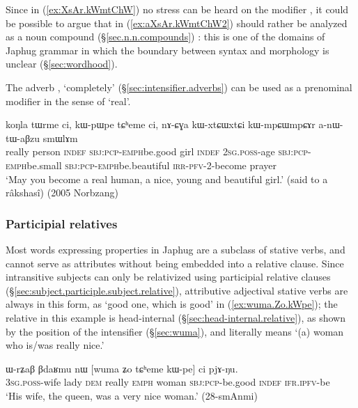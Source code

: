 Since in (\ref{ex:XsAr.kWmtChW}) no stress can be heard on the modifier , it could be possible to argue that  in  (\ref{ex:aXsAr.kWmtChW2}) should rather be analyzed as a noun compound (§\ref{sec.n.n.compounds}) : this is one of the domains of Japhug grammar in which the boundary between syntax and morphology is unclear (§\ref{sec:wordhood}).

The adverb , `completely' (§\ref{sec:intensifier.adverbs}) can be used as a prenominal modifier in the sense of `real'.

\begin{exe}
\ex \label{ex:koNla.tWrme}
\gll koŋla tɯrme ci, kɯ-pɯ\redp{}pe tɕʰeme ci,  nɤ-ɕɣa kɯ-xtɕɯ\redp{}xtɕi kɯ-mpɕɯ\redp{}mpɕɤr a-nɯ-tɯ-aβzu smɯlɤm \\
really person \textsc{indef} \textsc{sbj}:\textsc{pcp}-\textsc{emph}\redp{}be.good girl \textsc{indef} \textsc{2sg}.\textsc{poss}-age \textsc{sbj}:\textsc{pcp}-\textsc{emph}\redp{}be.small \textsc{sbj}:\textsc{pcp}-\textsc{emph}\redp{}be.beautiful \textsc{irr}-\textsc{pfv}-2-become prayer \\
\glt `May you become a real human, a nice, young and beautiful girl.' (said to a râkshasî) (2005 Norbzang)
\end{exe}

\subsubsection{Participial relatives} \label{ex:attributive.participles.stative.verbs}
 
Most words expressing properties in Japhug are a subclass of stative verbs, and cannot serve as attributes without being embedded into a relative clause. Since intransitive subjects can only be relativized using  participial relative clauses (§\ref{sec:subject.participle.subject.relative}), attributive adjectival stative verbs are always in this form, as  `good one, which is good' in (\ref{ex:wuma.Zo.kWpe}); the relative   in this example is head-internal (§\ref{sec:head-internal.relative}), as shown by the position of the intensifier  (§\ref{sec:wuma}), and literally means `(a) woman who is/was really nice.'

\begin{exe}
   \ex  \label{ex:wuma.Zo.kWpe}
\gll  ɯ-rʑaβ βdaʁmu nɯ [wuma ʑo tɕʰeme kɯ-pe] ci pjɤ-ŋu. \\
\textsc{3sg}.\textsc{poss}-wife lady \textsc{dem} really \textsc{emph} woman \textsc{sbj}:\textsc{pcp}-be.good \textsc{indef} \textsc{ifr}.\textsc{ipfv}-be \\
\glt `His wife, the queen, was a very nice woman.' (28-smAnmi)
\end{exe}  

